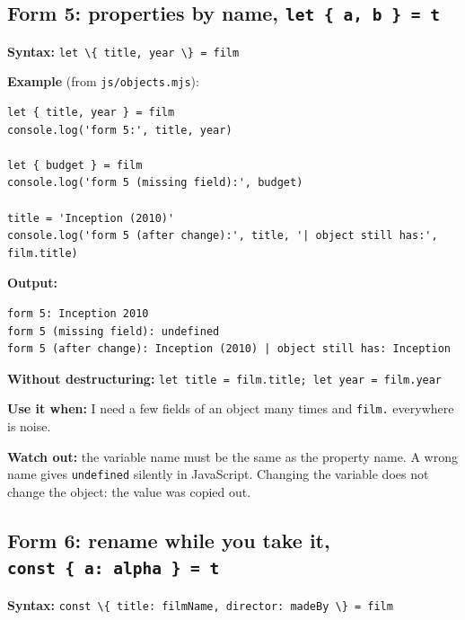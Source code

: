 \documentclass[
]{article}
\newcommand{\passthrough}[1]{#1}
\begin{document}
\hypertarget{form-5-properties-by-name-let-a-b-t}{%
\subsection{\texorpdfstring{Form 5: properties by name,
\texttt{let\ \{\ a,\ b\ \}\ =\ t}}{Form 5: properties by name, let \{ a, b \} = t}}\label{form-5-properties-by-name-let-a-b-t}}

\textbf{Syntax:} \passthrough{\lstinline!let \{ title, year \} = film!}

\textbf{Example} (from \passthrough{\lstinline!js/objects.mjs!}):

\begin{lstlisting}
let { title, year } = film
console.log('form 5:', title, year)

let { budget } = film
console.log('form 5 (missing field):', budget)

title = 'Inception (2010)'
console.log('form 5 (after change):', title, '| object still has:', film.title)
\end{lstlisting}

\textbf{Output:}

\begin{lstlisting}
form 5: Inception 2010
form 5 (missing field): undefined
form 5 (after change): Inception (2010) | object still has: Inception
\end{lstlisting}

\textbf{Without destructuring:}
\passthrough{\lstinline!let title = film.title; let year = film.year!}

\textbf{Use it when:} I need a few fields of an object many times and
\passthrough{\lstinline!film.!} everywhere is noise.

\textbf{Watch out:} the variable name must be the same as the property
name. A wrong name gives \passthrough{\lstinline!undefined!} silently in
JavaScript. Changing the variable does not change the object: the value
was copied out.

\hypertarget{form-6-rename-while-you-take-it-const-a-alpha-t}{%
\subsection{\texorpdfstring{Form 6: rename while you take it,
\texttt{const\ \{\ a:\ alpha\ \}\ =\ t}}{Form 6: rename while you take it, const \{ a: alpha \} = t}}\label{form-6-rename-while-you-take-it-const-a-alpha-t}}

\textbf{Syntax:}
\passthrough{\lstinline!const \{ title: filmName, director: madeBy \} = film!}
\end{document}
